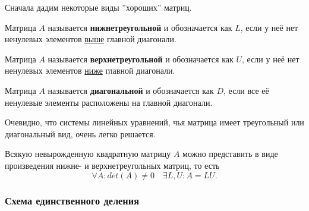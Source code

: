 \documentclass{article}
\begin{document}
Сначала дадим некоторые виды ''хороших'' матриц.

\begin{define}
	Матрица $A$ называется \textbf{нижнетреугольной} и обозначается как $L$,
	если у неё нет ненулевых элементов \underline{выше} главной диагонали.
\end{define}

\begin{define}
	Матрица $A$ называется \textbf{верхнетреугольной} и обозначается как
	$U$, если у неё нет ненулевых элементов \underline{ниже} главной
	диагонали.
\end{define}

\begin{define}
	Матрица $A$ называется \textbf{диагональной} и обозначается как $D$,
	если все её ненулевые элементы расположены на главной диагонали.
\end{define}

Очевидно, что системы линейных уравнений, чья матрица имеет треугольный
или диагональный вид, очень легко решается.

\begin{theorem}[об LU-разложении]
	Всякую невырожденную квадратную матрицу $A$ можно представить в виде
	произведения нижне- и верхнетреугольных матриц, то есть
	\[\forall A: det(A)\ne 0\quad\exists L,U: A=LU.\]
\end{theorem}

\subsubsection{Схема единственного деления}
\end{document}
